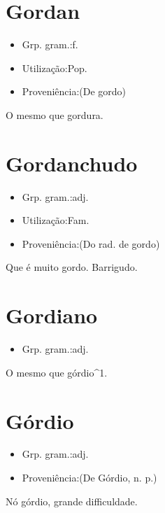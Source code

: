 \section{Gordan}
\begin{itemize}
\item {Grp. gram.:f.}
\end{itemize}
\begin{itemize}
\item {Utilização:Pop.}
\end{itemize}
\begin{itemize}
\item {Proveniência:(De \textunderscore gordo\textunderscore )}
\end{itemize}
O mesmo que \textunderscore gordura\textunderscore .
\section{Gordanchudo}
\begin{itemize}
\item {Grp. gram.:adj.}
\end{itemize}
\begin{itemize}
\item {Utilização:Fam.}
\end{itemize}
\begin{itemize}
\item {Proveniência:(Do rad. de \textunderscore gordo\textunderscore )}
\end{itemize}
Que é muito gordo.
Barrigudo.
\section{Gordiano}
\begin{itemize}
\item {Grp. gram.:adj.}
\end{itemize}
O mesmo que \textunderscore górdio\textunderscore ^1.
\section{Górdio}
\begin{itemize}
\item {Grp. gram.:adj.}
\end{itemize}
\begin{itemize}
\item {Proveniência:(De \textunderscore Górdio\textunderscore , n. p.)}
\end{itemize}
\textunderscore Nó górdio\textunderscore , grande difficuldade.
